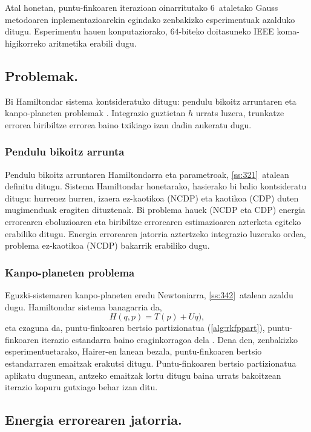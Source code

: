 Atal honetan, puntu-finkoaren iterazioan oinarritutako $6$~ataletako Gauss metodoaren inplementazioarekin egindako zenbakizko esperimentuak azalduko ditugu. Esperimentu hauen konputaziorako, $64$-biteko doitasuneko IEEE koma-higikorreko aritmetika erabili dugu.

\subsection{Problemak.}

Bi Hamiltondar sistema kontsideratuko ditugu: pendulu bikoitz arruntaren eta kanpo-planeten problemak \cite{Hairer2006} \cite{Dumitru}. Integrazio guztietan $h$ urrats luzera, trunkatze errorea biribiltze errorea baino txikiago izan dadin aukeratu dugu.

\subsubsection*{Pendulu bikoitz arrunta}
Pendulu bikoitz arruntaren Hamiltondarra eta parametroak, \ref{ss:321}~atalean definitu ditugu. Sistema Hamiltondar honetarako, hasierako bi balio kontsideratu ditugu: hurrenez hurren, izaera ez-kaotikoa (NCDP) eta kaotikoa (CDP) duten mugimenduak eragiten dituztenak. Bi problema hauek (NCDP eta CDP) energia errorearen eboluzioaren eta biribiltze errorearen estimazioaren azterketa egiteko erabiliko ditugu. Energia errorearen jatorria aztertzeko integrazio luzerako ordea, problema ez-kaotikoa (NCDP) bakarrik erabiliko dugu.       

\subsubsection*{Kanpo-planeten problema}
Eguzki-sistemaren kanpo-planeten eredu Newtoniarra, \ref{ss:342}~atalean azaldu dugu. Hamiltondar sistema banagarria da,
\begin{equation*}
H(q,p)= T(p)+Uq),
\end{equation*}
eta ezaguna da, puntu-finkoaren bertsio partizionatua (\ref{alg:rkfppart}), puntu-finkoaren iterazio estandarra baino eraginkorragoa dela  \cite{Sanz-Serna1992}. Dena den, zenbakizko esperimentuetarako, Hairer-en \cite{Hairer2008} lanean bezala, puntu-finkoaren bertsio estandarraren emaitzak erakutsi ditugu. Puntu-finkoaren bertsio partizionatua aplikatu dugunean, antzeko emaitzak lortu ditugu baina urrats bakoitzean iterazio kopuru gutxiago behar izan ditu.  


\subsection{Energia errorearen jatorria.}

